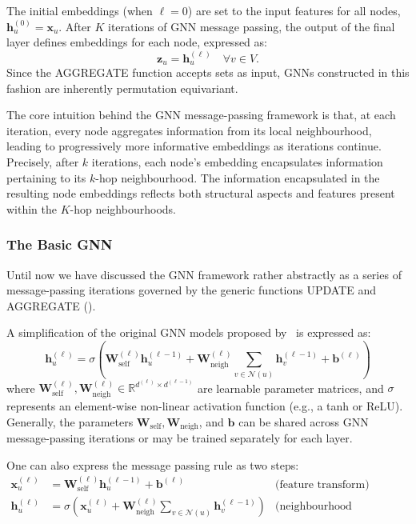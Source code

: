 The initial embeddings (when $ \ell=0 $) are set to the input features for all nodes, $ \mathbf{h}_u^{(0)} = \mathbf{x}_u $. After $ K $ iterations of GNN message passing, the output of the final layer defines embeddings for each node, expressed as:
\begin{equation*}
    \mathbf{z}_u=\mathbf{h}_u^{(\ell)} \quad \forall v \in V.
\end{equation*}
Since the AGGREGATE function accepts sets as input, GNNs constructed in this fashion are inherently permutation equivariant.

The core intuition behind the GNN message-passing framework is that, at each iteration, every node aggregates information from its local neighbourhood, leading to progressively more informative embeddings as iterations continue. Precisely, after $ k $ iterations, each node's embedding encapsulates information pertaining to its $ k $-hop neighbourhood. The information encapsulated in the resulting node embeddings reflects both structural aspects and features present within the $ K $-hop neighbourhoods.

\subsubsection{The Basic GNN}
Until now we have discussed the GNN framework rather abstractly as a series of message-passing iterations governed by the generic functions UPDATE and AGGREGATE (). 

A simplification of the original GNN models proposed by~\cite{Merkwirth2005automaticGenerationComplementaryDescriptorsMolecularGraphNetworks}\cite{scarselli2008graphNeuralNetworkModel} is expressed as:
\begin{equation}\label{eq:basicGNN}
    \mathbf{h}_u^{(\ell)} = \sigma\left(\mathbf{W}_\text{self}^{(\ell)}\mathbf{h}_u^{(\ell-1)} + \mathbf{W}_\text{neigh}^{(\ell)}\sum_{v\in\mathcal{N}(u)}\mathbf{h}_v^{(\ell-1)} + \mathbf{b}^{(\ell)}\right)
\end{equation}
where $ \mathbf{W}_\text{self}^{(\ell)}, \mathbf{W}_\text{neigh}^{(\ell)} \in \mathbb{R}^{d^{(\ell)}\times d^{(\ell-1)}} $ are learnable parameter matrices, and $ \sigma $ represents an element-wise non-linear activation function (e.g., a tanh or ReLU). Generally, the parameters $ \mathbf{W}_\text{self}, \mathbf{W}_\text{neigh} $, and $\mathbf{b}$ can be shared across GNN message-passing iterations or may be trained separately for each layer. 

One can also express the message passing rule as two steps:
\begin{align}
    \mathbf{x}_u^{(\ell)} &= \mathbf{W}_\text{self}^{(\ell)}\mathbf{h}_u^{(\ell-1)} + \mathbf{b}^{(\ell)} & \text{(feature transform)}\label{eq:featureTransform} \\ 
    \mathbf{h}_u^{(\ell)} &= \sigma\left(\mathbf{x}_u^{(\ell)} + \mathbf{W}_\text{neigh}^{(\ell)} \sum_{v\in\mathcal{N}(u)}\mathbf{h}_v^{(\ell-1)}\right) & \text{(neighbourhood aggregation)} \label{eq:neighAgg}
\end{align}

